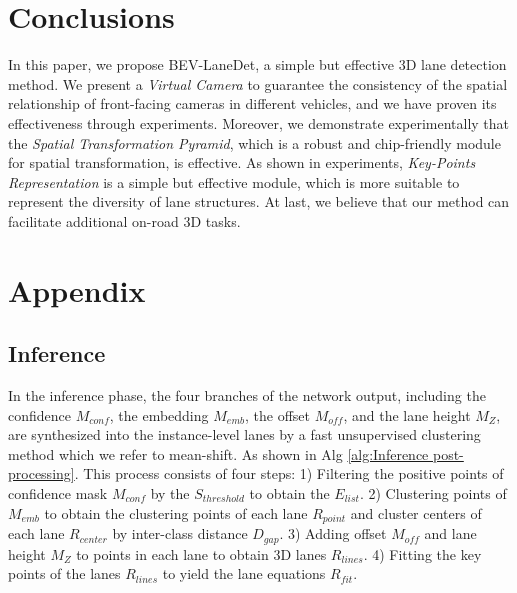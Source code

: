 \documentclass[10pt,twocolumn,letterpaper]{article}
\begin{document}
\section{Conclusions}
In this paper, we propose BEV-LaneDet, a simple but effective 3D lane detection method. We present a \textit{Virtual Camera} to guarantee the consistency of the spatial relationship of front-facing cameras in different vehicles, and we have proven its effectiveness through experiments. Moreover, we demonstrate experimentally that the \textit{Spatial Transformation Pyramid}, which is a robust and chip-friendly module for spatial transformation, is effective. As shown in experiments, \textit{Key-Points Representation} is a simple but effective module, which is more suitable to represent the diversity of lane structures. At last, we believe that our method can facilitate additional on-road 3D tasks.


{
	\small
	
	
}
\clearpage
\appendix
\section{Appendix}

\subsection{Inference}
In the inference phase, the four branches of the network output, including the confidence $M_{conf}$, the embedding $M_{emb}$, the offset $M_{off}$, and the lane height $M_Z$, are synthesized into the instance-level lanes by a fast unsupervised clustering method which we refer to mean-shift. As shown in Alg \ref{alg:Inference post-processing}. This process consists of four steps: 1) Filtering the positive points of confidence mask $M_{conf}$ by the $S_{threshold}$ to obtain the $E_{list}$. 2) Clustering points of $M_{emb}$ to obtain the clustering points of each lane $R_{point}$  and cluster centers of each lane $R_{center}$ by inter-class distance $D_{gap}$. 3) Adding offset $M_{off}$ and lane height $M_Z$  to points in each lane to obtain 3D lanes $R_{lines}$. 4) Fitting the key points of the lanes $R_{lines}$ to yield the lane equations $R_{fit}$.
\end{document}
